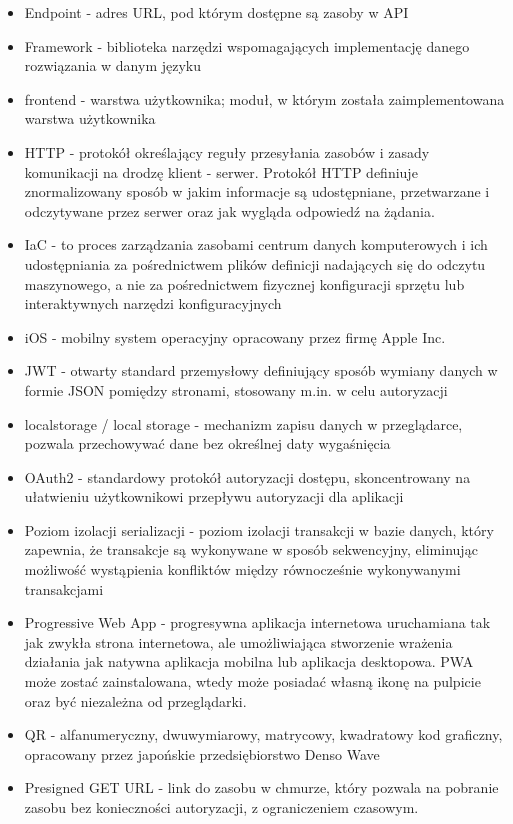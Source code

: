 \documentclass[../main.tex]{subfiles}
\begin{document}
\begin{itemize}
        \item Endpoint - adres URL, pod którym dostępne są zasoby w API
        \item Framework - biblioteka narzędzi wspomagających implementację danego rozwiązania w danym języku
        \item frontend - warstwa użytkownika; moduł, w którym została zaimplementowana warstwa użytkownika
        \item HTTP - protokół określający reguły przesyłania zasobów i zasady komunikacji na drodzę klient - serwer. Protokół HTTP definiuje znormalizowany sposób w jakim informacje są udostępniane, przetwarzane i odczytywane przez serwer oraz jak wygląda odpowiedź na żądania. \cite{ks-http}
        \item IaC - to proces zarządzania zasobami centrum danych komputerowych i ich udostępniania za pośrednictwem plików definicji nadających się do odczytu maszynowego, a nie za pośrednictwem fizycznej konfiguracji sprzętu lub interaktywnych narzędzi konfiguracyjnych
        \item iOS - mobilny system operacyjny opracowany przez firmę Apple Inc.
        \item JWT - otwarty standard przemysłowy definiujący sposób wymiany danych w formie JSON pomiędzy stronami, stosowany m.in. w celu autoryzacji
        \item localstorage / local storage - mechanizm zapisu danych w przeglądarce, pozwala przechowywać dane bez określnej daty wygaśnięcia
        \item OAuth2 - standardowy protokół autoryzacji dostępu, skoncentrowany na ułatwieniu użytkownikowi przepływu autoryzacji dla aplikacji
        \item Poziom izolacji serializacji - poziom izolacji transakcji w bazie danych, który zapewnia, że transakcje są wykonywane w sposób sekwencyjny, eliminując możliwość wystąpienia konfliktów między równocześnie wykonywanymi transakcjami
        \item Progressive Web App - progresywna aplikacja internetowa uruchamiana tak jak zwykła strona internetowa, ale umożliwiająca stworzenie wrażenia działania jak natywna aplikacja mobilna lub aplikacja desktopowa. PWA może zostać zainstalowana, wtedy może posiadać własną ikonę na pulpicie oraz być niezależna od przeglądarki.
        \item QR - alfanumeryczny, dwuwymiarowy, matrycowy, kwadratowy kod graficzny, opracowany przez japońskie przedsiębiorstwo Denso Wave
        \item Presigned GET URL - link do zasobu w chmurze, który pozwala na pobranie zasobu bez konieczności autoryzacji, z ograniczeniem czasowym.

\end{itemize}
\end{document}

